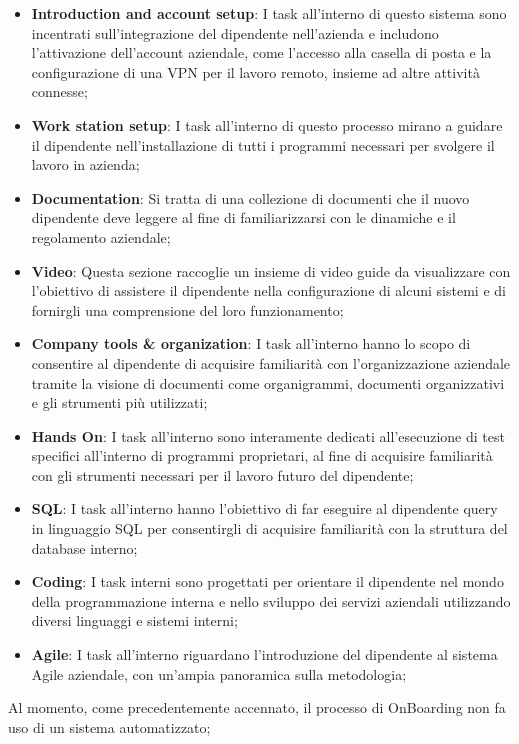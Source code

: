 \begin{itemize}
    \item \textbf{Introduction and account setup}: I task all'interno di questo sistema sono incentrati sull'integrazione del dipendente 
    nell'azienda e includono l'attivazione dell'account aziendale, come l'accesso alla casella di posta e la configurazione di una VPN per 
    il lavoro remoto, insieme ad altre attività connesse;
    \item \textbf{Work station setup}: I task all'interno di questo processo mirano a guidare il dipendente nell'installazione di tutti 
    i programmi necessari per svolgere il lavoro in azienda;
    \item \textbf{Documentation}: Si tratta di una collezione di documenti che il nuovo dipendente deve leggere al fine di familiarizzarsi 
    con le dinamiche e il regolamento aziendale;
    \item \textbf{Video}: Questa sezione raccoglie un insieme di video guide da visualizzare con l'obiettivo di assistere il dipendente 
    nella configurazione di alcuni sistemi e di fornirgli una comprensione del loro funzionamento;
    \item \textbf{Company tools \& organization}: I task all'interno hanno lo scopo di consentire al dipendente di acquisire familiarità con 
    l'organizzazione aziendale tramite la visione di documenti come organigrammi, documenti organizzativi e gli strumenti più utilizzati;
    \item \textbf{Hands On}: I task all'interno sono interamente dedicati all'esecuzione di test specifici all'interno di programmi 
    proprietari, al fine di acquisire familiarità con gli strumenti necessari per il lavoro futuro del dipendente;
    \item \textbf{SQL}: I task all'interno hanno l'obiettivo di far eseguire al dipendente query in linguaggio SQL per 
    consentirgli di acquisire familiarità con la struttura del database interno;
    \item \textbf{Coding}: I task interni sono progettati per orientare il dipendente nel mondo della programmazione interna 
    e nello sviluppo dei servizi aziendali utilizzando diversi linguaggi e sistemi interni;
    \item \textbf{Agile}: I task all'interno riguardano l'introduzione del dipendente al sistema Agile aziendale, 
    con un'ampia panoramica sulla metodologia; 
\end{itemize}
%
Al momento, come precedentemente accennato, il processo di OnBoarding non fa uso di un sistema automatizzato; 
